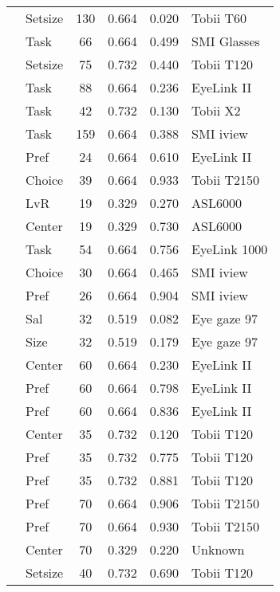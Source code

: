 \begin{longtable}{p{8cm}lcccl}
  \cite{grebitus2015} & Setsize & 130 & 0.664 & 0.020 & Tobii T60 \\ 
  \cite{guyader2017} & Task & 66 & 0.664 & 0.499 & SMI Glasses \\ 
  \cite{hong2016a} & Setsize & 75 & 0.732 & 0.440 & Tobii T120 \\ 
  \cite{huang2011} & Task & 88 & 0.664 & 0.236 & EyeLink II \\ 
  \cite{hwang2017} & Task & 42 & 0.732 & 0.130 & Tobii X2 \\ 
  \cite{keller2014} & Task & 159 & 0.664 & 0.388 & SMI iview \\ 
  \cite{kim2012a} & Pref & 24 & 0.664 & 0.610 & EyeLink II \\ 
  \cite{krajbich2010a} & Choice & 39 & 0.664 & 0.933 & Tobii T2150 \\ 
  \cite{kreplin2014a} & LvR & 19 & 0.329 & 0.270 & ASL6000 \\ 
  \cite{kreplin2014a} & Center & 19 & 0.329 & 0.730 & ASL6000 \\ 
  \cite{leboeuf2016} & Task & 54 & 0.664 & 0.756 & EyeLink 1000 \\ 
  \cite{lindner2014} & Choice & 30 & 0.664 & 0.465 & SMI iview \\ 
  \cite{lindner2014} & Pref & 26 & 0.664 & 0.904 & SMI iview \\ 
  \cite{lohse1997a} & Sal & 32 & 0.519 & 0.082 & Eye gaze 97 \\ 
  \cite{lohse1997a} & Size & 32 & 0.519 & 0.179 & Eye gaze 97 \\ 
  \cite{meissner2016a} & Center & 60 & 0.664 & 0.230 & EyeLink II \\ 
  \cite{meissner2016a} & Pref & 60 & 0.664 & 0.798 & EyeLink II \\ 
  \cite{meissner2016a} & Pref & 60 & 0.664 & 0.836 & EyeLink II \\ 
  \cite{meissner2016a} & Center & 35 & 0.732 & 0.120 & Tobii T120 \\ 
  \cite{meissner2016a} & Pref & 35 & 0.732 & 0.775 & Tobii T120 \\ 
  \cite{meissner2016a} & Pref & 35 & 0.732 & 0.881 & Tobii T120 \\ 
  \cite{meissner2016a} & Pref & 70 & 0.664 & 0.906 & Tobii T2150 \\ 
  \cite{meissner2016a} & Pref & 70 & 0.664 & 0.930 & Tobii T2150 \\ 
  \cite{meissner2016a} & Center & 70 & 0.329 & 0.220 & Unknown \\ 
  \cite{meissner2016b} & Setsize & 40 & 0.732 & 0.690 & Tobii T120 \\ 

\end{longtable}
